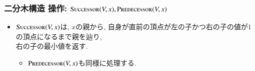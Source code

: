 \documentclass[main]{subfiles}
\begin{document}
\begin{frame}\frametitle{二分木構造 操作: {\small $\mathrm{\text{S\textsc{uccessor}}}(V,x), \mathrm{\text{P\textsc{redecessor}}}(V,x)$}}
\begin{itemize}
\item $\mathrm{\text{S\textsc{uccessor}}}(V,x)$は, $x$の親から, 自身が直前の頂点が左の子かつ右の子の値が$1$の頂点になるまで親を辿り, \\右の子の最小値を返す. 
\begin{itemize}
\item $\mathrm{\text{P\textsc{redecessor}}}(V,x)$も同様に処理する.
\end{itemize}
\end{itemize}
 

\end{frame}
\end{document}
